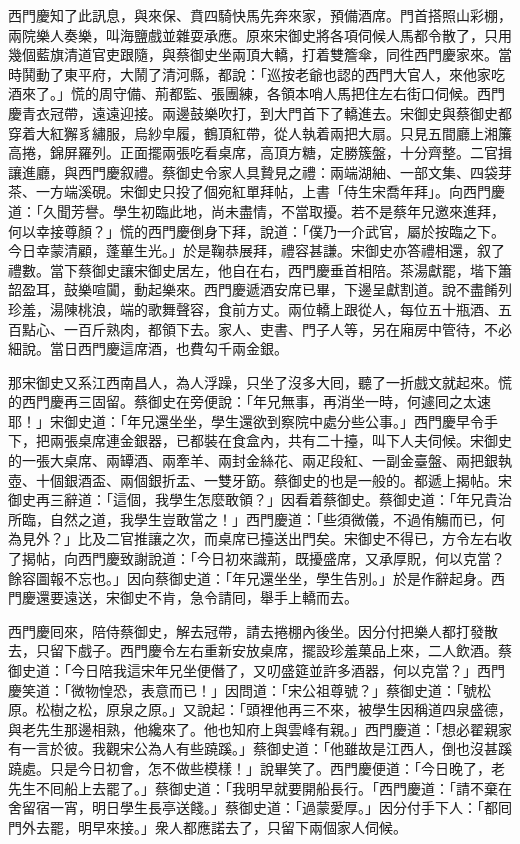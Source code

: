 西門慶知了此訊息，與來保、賁四騎快馬先奔來家，預備酒席。門首搭照山彩棚，兩院樂人奏樂，叫海鹽戲並雜耍承應。原來宋御史將各項伺候人馬都令散了，只用幾個藍旗清道官吏跟隨，與蔡御史坐兩頂大轎，打着雙簷傘，同徃西門慶家來。當時鬨動了東平府，大鬧了清河縣，都說：「巡按老爺也認的西門大官人，來他家吃酒來了。」慌的周守備、荊都監、張團練，各領本哨人馬把住左右街口伺候。西門慶青衣冠帶，遠遠迎接。兩邊鼓樂吹打，到大門首下了轎進去。宋御史與蔡御史都穿着大紅獬豸繡服，烏紗皁履，鶴頂紅帶，從人執着兩把大扇。只見五間廳上湘簾高捲，錦屏羅列。正面擺兩張吃看桌席，高頂方糖，定勝簇盤，十分齊整。二官揖讓進廳，與西門慶叙禮。蔡御史令家人具贄見之禮：兩端湖紬、一部文集、四袋芽茶、一方端溪硯。宋御史只投了個宛紅單拜帖，上書「侍生宋喬年拜」。向西門慶道：「久聞芳譽。學生初臨此地，尚未盡情，不當取擾。若不是蔡年兄邀來進拜，何以幸接尊顏？」慌的西門慶倒身下拜，說道：「僕乃一介武官，屬於按臨之下。今日幸蒙清顧，蓬蓽生光。」於是鞠恭展拜，禮容甚謙。宋御史亦答禮相還，叙了禮數。當下蔡御史讓宋御史居左，他自在右，西門慶垂首相陪。茶湯獻罷，堦下簫韶盈耳，鼓樂喧闐，動起樂來。西門慶遞酒安席已畢，下邊呈獻割道。說不盡餚列珍羞，湯陳桃浪，端的歌舞聲容，食前方丈。兩位轎上跟從人，每位五十瓶酒、五百點心、一百斤熟肉，都領下去。家人、吏書、門子人等，另在廂房中管待，不必細說。當日西門慶這席酒，也費勾千兩金銀。

那宋御史又系江西南昌人，為人浮躁，只坐了沒多大囘，聽了一折戲文就起來。慌的西門慶再三固留。蔡御史在旁便說：「年兄無事，再消坐一時，何遽囘之太速耶！」宋御史道：「年兄還坐坐，學生還欲到察院中處分些公事。」西門慶早令手下，把兩張桌席連金銀器，已都裝在食盒內，共有二十擡，叫下人夫伺候。宋御史的一張大桌席、兩罈酒、兩牽羊、兩封金絲花、兩疋段紅、一副金臺盤、兩把銀執壺、十個銀酒盃、兩個銀折盂、一雙牙筯。蔡御史的也是一般的。都遞上揭帖。宋御史再三辭道：「這個，我學生怎麼敢領？」因看着蔡御史。蔡御史道：「年兄貴治所臨，自然之道，我學生豈敢當之！」西門慶道：「些須微儀，不過侑觴而已，何為見外？」比及二官推讓之次，而桌席已擡送出門矣。宋御史不得已，方令左右收了揭帖，向西門慶致謝說道：「今日初來識荊，既擾盛席，又承厚貺，何以克當？餘容圖報不忘也。」因向蔡御史道：「年兄還坐坐，學生告別。」於是作辭起身。西門慶還要遠送，宋御史不肯，急令請囘，舉手上轎而去。

西門慶囘來，陪侍蔡御史，解去冠帶，請去捲棚內後坐。因分付把樂人都打發散去，只留下戲子。西門慶令左右重新安放桌席，擺設珍羞菓品上來，二人飲酒。蔡御史道：「今日陪我這宋年兄坐便僭了，又叨盛筵並許多酒器，何以克當？」西門慶笑道：「微物惶恐，表意而已！」因問道：「宋公祖尊號？」蔡御史道：「號松原。松樹之松，原泉之原。」又說起：「頭裡他再三不來，被學生因稱道四泉盛德，與老先生那邊相熟，他纔來了。他也知府上與雲峰有親。」西門慶道：「想必翟親家有一言於彼。我觀宋公為人有些蹺蹊。」蔡御史道：「他雖故是江西人，倒也沒甚蹊蹺處。只是今日初會，怎不做些模樣！」說畢笑了。西門慶便道：「今日晚了，老先生不囘船上去罷了。」蔡御史道：「我明早就要開船長行。「西門慶道：「請不棄在舍留宿一宵，明日學生長亭送餞。」蔡御史道：「過蒙愛厚。」因分付手下人：「都囘門外去罷，明早來接。」衆人都應諾去了，只留下兩個家人伺候。

